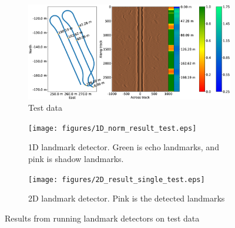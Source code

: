 \begin{figure} [hb] %
     \centering
    \begin{subfigure}[t]{0.87\textwidth}
         \centering
         \includegraphics[trim=0cm 3.4cm 0cm 3.4cm, clip=true, width=\textwidth]{figures/path_sonar_colorbars_test.eps}
         \caption{Test data}
         \label{fig:test_data}
     \end{subfigure}
     \hfill
     \begin{subfigure}[b]{0.44\textwidth}
         \centering
         \texttt{[image: figures/1D\_norm\_result\_test.eps]}
         \caption{1D landmark detector. Green is echo landmarks, and pink is shadow landmarks.}
         \label{fig:1D_norm_result_test}
     \end{subfigure}
     \begin{subfigure}[b]{0.44\textwidth}
         \centering
         \texttt{[image: figures/2D\_result\_single\_test.eps]}
         \caption{2D landmark detector. Pink is the detected landmarks}
         \label{fig:2D_result_single_test}
     \end{subfigure}
        \caption{Results from running landmark detectors on test data}
        \label{fig:landmark_detection_test_data}
\end{figure}
